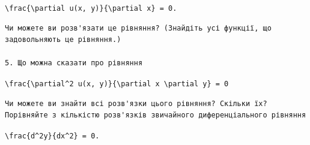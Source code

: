 \documentclass[
  ukrainian,
]{article}
\begin{document}
\texttt{\textbackslash{}frac\{\textbackslash{}partial\ u(x,\ y)\}\{\textbackslash{}partial\ x\}\ =\ 0.}

\begin{verbatim}
Чи можете ви розв'язати це рівняння? (Знайдіть усі функції, що задовольняють це рівняння.)

5. Що можна сказати про рівняння
\end{verbatim}

\texttt{\textbackslash{}frac\{\textbackslash{}partial\^{}2\ u(x,\ y)\}\{\textbackslash{}partial\ x\ \textbackslash{}partial\ y\}\ =\ 0}

\begin{verbatim}
Чи можете ви знайти всі розв'язки цього рівняння? Скільки їх? Порівняйте з кількістю розв'язків звичайного диференціального рівняння
\end{verbatim}

\texttt{\textbackslash{}frac\{d\^{}2y\}\{dx\^{}2\}\ =\ 0.}
\end{document}
